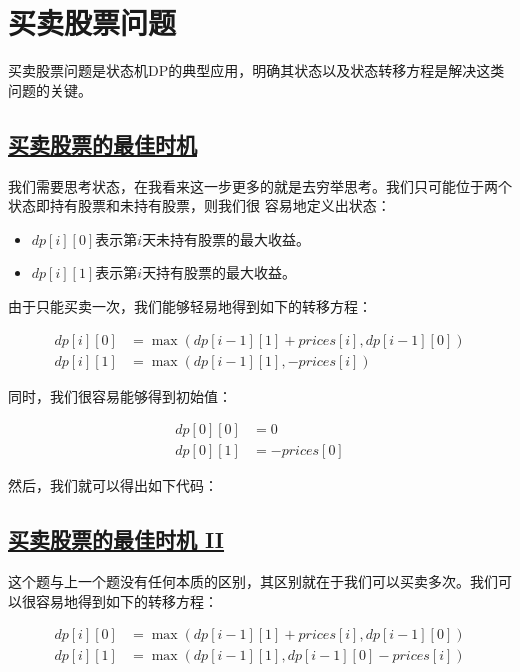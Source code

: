 \documentclass[../../main.tex]{subfiles}
\begin{document}


\section{买卖股票问题}

买卖股票问题是状态机DP的典型应用，明确其状态以及状态转移方程是解决这类问题的关键。

\subsection{\href{https://leetcode.cn/problems/best-time-to-buy-and-sell-stock/}{买卖股票的最佳时机}}

我们需要思考状态，在我看来这一步更多的就是去穷举思考。我们只可能位于两个状态即持有股票和未持有股票，则我们很
容易地定义出状态：

\begin{itemize}
  \item $dp[i][0]$表示第$i$天未持有股票的最大收益。
  \item $dp[i][1]$表示第$i$天持有股票的最大收益。
\end{itemize}

由于只能买卖一次，我们能够轻易地得到如下的转移方程：

\begin{align*}
  dp[i][0] &= \max(dp[i - 1][1] + prices[i], dp[i - 1][0]) \\
  dp[i][1] &= \max(dp[i - 1][1], -prices[i])
\end{align*}

同时，我们很容易能够得到初始值：

\begin{align*}
  dp[0][0] &= 0 \\
  dp[0][1] &= -prices[0]
\end{align*}

然后，我们就可以得出如下代码：



\subsection{\href{https://leetcode-cn.com/problems/best-time-to-buy-and-sell-stock-ii/}{买卖股票的最佳时机 II}}

这个题与上一个题没有任何本质的区别，其区别就在于我们可以买卖多次。我们可以很容易地得到如下的转移方程：

\begin{align*}
  dp[i][0] &= \max(dp[i - 1][1] + prices[i], dp[i - 1][0]) \\
  dp[i][1] &= \max(dp[i - 1][1], dp[i - 1][0] - prices[i])
\end{align*}
\end{document}
